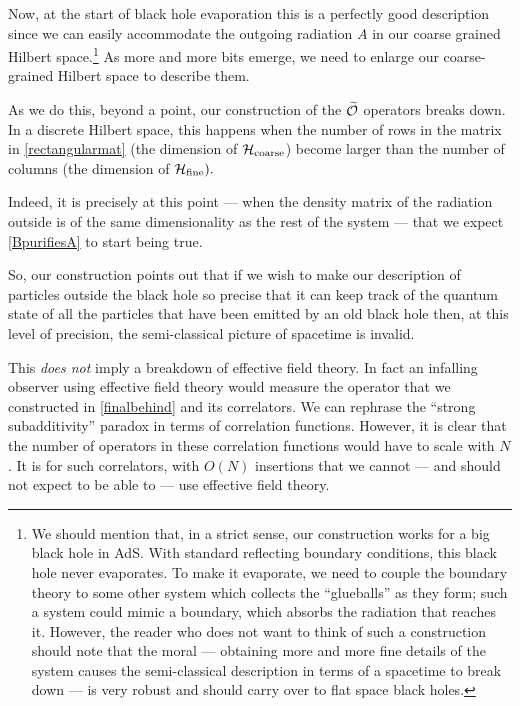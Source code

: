 Now, at the start of black hole evaporation this is a perfectly good description since we can easily accommodate the
outgoing radiation $A$ in our coarse grained Hilbert space.\footnote{We should mention that, in a strict sense, our construction works for a big black hole in AdS. With standard reflecting boundary conditions, this black hole never evaporates. To make it evaporate, we need to couple the boundary 
theory to some other system which collects the ``glueballs'' as they form; such a system could mimic a boundary, which absorbs the radiation that reaches it. However, the reader who does not want to think of such a construction should note that the moral --- obtaining more and more fine details
of the system causes the semi-classical description in terms of a spacetime to break down --- is very robust and  should carry over to flat space black holes.}
As more and more bits emerge, we need to enlarge our coarse-grained Hilbert space to
describe them. 

As we do this, beyond a point, our construction of the $\widetilde{\cal O}$ operators breaks down. In a discrete Hilbert space, this happens when the number of rows in the matrix in \eqref{rectangularmat} (the dimension of ${\cal H}_{\text{coarse}}$) become larger than the number of columns (the dimension of ${\cal H}_{\text{fine}}).$ 

Indeed, it is precisely at this point --- when the density matrix of the radiation outside is of the same dimensionality as the rest of the system --- that we expect \eqref{BpurifiesA} to start being true. 

So, our construction points out that if we wish to make our description of particles outside the black hole so precise that it can keep track of the quantum state of all the particles that have been emitted by an old black hole then, at this level of precision, the semi-classical picture of spacetime is invalid. 

 This {\em does not} imply a breakdown of effective field theory. In fact an infalling observer using effective field theory would measure the operator that we constructed in \eqref{finalbehind} and its correlators. We can rephrase the ``strong subadditivity'' paradox in terms of correlation functions. However, it is clear that the number of operators in these correlation functions would have to scale with $N$. It is for such correlators, with $O(N)$ insertions that we cannot --- and should not expect to be able to ---  use effective field theory. 


